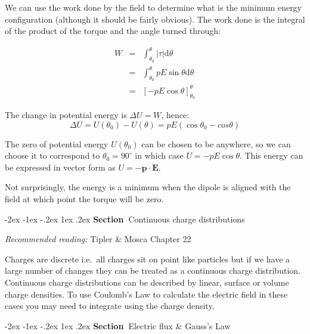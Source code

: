 \documentclass[
]{book}
\makeatletter
\renewcommand\section{%
\@startsection{section}{1}{\z@}%
              {-2ex \@plus -1ex \@minus -.2ex}%
              {1ex \@plus .2ex}%
              {\sffamily\bfseries\large\noindent Section~}}
\numberwithin{equation}{section}
\makeatother
\begin{document}
We can use the work done by the field to determine what is the minimum
energy configuration (although it should be fairly obvious). The work
done is the integral of the product of the torque and the angle turned
through:

\begin{equation}
\label{eq:workDone}
\begin{array}{rcll}
W &=& \int_{\theta_0}^{\theta} |\tau| \mathrm{d}\theta \\
&=& \int_{\theta_0}^{\theta} pE \sin\theta \mathrm{d}\theta \\ 
&=& [-pE \cos\theta]_{\theta_0}^{\theta}
\end{array}
\end{equation}

The change in potential energy is \(\Delta U = W\), hence:
\begin{equation}
\label{eq:changeEpot}
\Delta U = U(\theta_0) - U(\theta) = pE(\cos⁡\theta_0 - cos\theta)
\end{equation}

The zero of potential energy \(U(\theta_0)\) can be chosen to be anywhere,
so we can choose it to correspond to \(\theta_0 = 90^{\circ}\) in which
case \(U = -pE \cos\theta\). This energy can be expressed in vector form
as \(U = - \mathbf{p} \cdot \mathbf{E}\).

Not surprisingly, the energy is a minimum when the dipole is aligned
with the field at which point the torque will be zero.

\hypertarget{continuous-charge-distributions}{%
\section{Continuous charge distributions}\label{continuous-charge-distributions}}

\emph{Recommended reading:} Tipler \& Mosca Chapter 22

Charges are discrete i.e.~all charges sit on point like particles but if
we have a large number of changes they can be treated as a continuous
charge distribution. Continuous charge distributions can be described by
linear, surface or volume charge densities. To use Coulomb's Law to
calculate the electric field in these cases you may need to integrate
using the charge density.

\hypertarget{electric-flux-gausss-law}{%
\section{Electric flux \& Gauss's Law}\label{electric-flux-gausss-law}}
\end{document}
